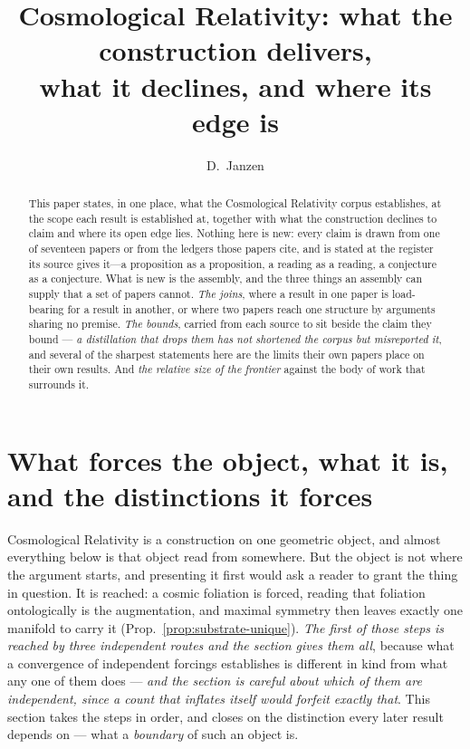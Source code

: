 \documentclass[11pt,a4paper]{article}
\title{Cosmological Relativity: what the construction delivers,\\
what it declines, and where its edge is}
\author{D.~Janzen}
\date{}
\theoremstyle{plain}
\theoremstyle{definition}
\begin{document}
\maketitle

\begin{abstract}
This paper states, in one place, what the Cosmological Relativity corpus establishes, at the scope each
result is established at, together with what the construction declines to claim and where its open edge
lies. Nothing here is new: every claim is drawn from one of seventeen papers or from the ledgers those
papers cite, and is stated at the register its source gives it---a proposition as a proposition, a reading
as a reading, a conjecture as a conjecture. What is new is the assembly, and the three things an assembly can
supply that a set of papers cannot. \emph{The joins}, where a result in one paper is load-bearing for a
result in another, or where two papers reach one structure by arguments sharing no premise. \emph{The
bounds}, carried from each source to sit beside the claim they bound --- \emph{a distillation that drops
them has not shortened the corpus but misreported it}, and several of the sharpest statements here are the
limits their own papers place on their own results. And \emph{the relative size of the frontier} against the
body of work that surrounds it.
\end{abstract}

\section{What forces the object, what it is, and the distinctions it forces}\label{sec:object}

Cosmological Relativity is a construction on one geometric object, and almost everything below is that
object read from somewhere. But the object is not where the argument starts, and presenting it first would
ask a reader to grant the thing in question. It is reached: a cosmic foliation is forced, reading that
foliation ontologically is the augmentation, and maximal symmetry then leaves exactly one manifold to carry
it (Prop.~\ref{prop:substrate-unique}). \emph{The first of those steps is reached by three independent routes and the section gives them all},
because what a convergence of independent forcings establishes is different in kind from what any one of
them does --- \emph{and the section is careful about which of them are independent, since a count that
inflates itself would forfeit exactly that}. This
section takes the steps in order, and closes on the distinction every later result depends on --- what a
\emph{boundary} of such an object is.
\end{document}

